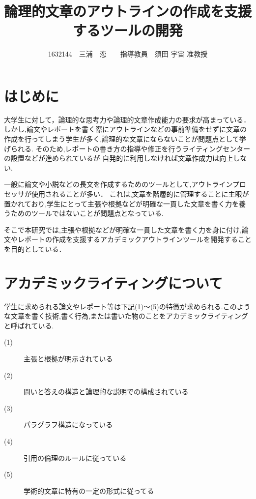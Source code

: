 \documentclass[twocolumn,10pt,a4j]{jsarticle}
\title{論理的文章のアウトラインの作成を支援するツールの開発}
\author{1632144　三浦　恋　　指導教員　須田 宇宙 准教授}
\date{}
\begin{document}
\maketitle

\section{はじめに}

大学生に対して，論理的な思考力や論理的文章作成能力の要求が高まっている．
しかし,論文やレポートを書く際にアウトラインなどの事前準備をせずに文章の作成を行ってしまう学生が多く,論理的な文章にならないことが問題点として挙げられる.
そのため,レポートの書き方の指導や修正を行うライティングセンターの設置などが進められているが
自発的に利用しなければ文章作成力は向上しない.

一般に論文や小説などの長文を作成するためのツールとして,アウトラインプロセッサが使用されることが多い．
これは,文章を階層的に管理することに主眼が置かれており,学生にとって主張や根拠などが明確な一貫した文章を書く力を養うためのツールではないことが問題点となっている.

そこで本研究では,主張や根拠などが明確な一貫した文章を書く力を身に付け,論文やレポートの作成を支援するアカデミックアウトラインツールを開発することを目的としている．

\section{アカデミックライティングについて}
\begin{comment}
一般に利用されているアウトラインプロセッサは全体の構造を組み立て,見出しをつけていき,文章を階層的に管理することのできるソフトウェアのことを指す.
しかし大学で学生に作成が求められる論文やレポート等には以下(1)~(5)の特徴が挙げられる.このような文章を書く技術,書く行為,または書いた物のことをアカデミックライティングと呼ぶ.
\end{comment}
学生に求められる論文やレポート等は下記(1)〜(5)の特徴が求められる.このような文章を書く技術,書く行為,または書いた物のことをアカデミックライティングと呼ばれている\cite{ren01}.


\begin{description}
  \item[(1)] 主張と根拠が明示されている
  \item[(2)] 問いと答えの構造と論理的な説明での構成されている
  \item[(3)] パラグラフ構造になっている
  \item[(4)] 引用の倫理のルールに従っている
  \item[(5)] 学術的文章に特有の一定の形式に従ってる
\end{description}
\end{document}
